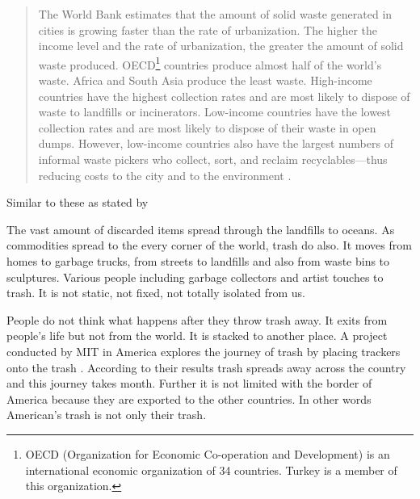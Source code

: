 %
\begin{quote}
The World Bank estimates that the amount of solid waste generated in cities is growing faster than the rate of urbanization. The higher the income level and the rate of urbanization, the greater the amount of solid waste produced. OECD\footnote{OECD (Organization for Economic Co-operation and Development) is an international economic organization of 34 countries. Turkey is a member of this organization.} countries produce almost half of the world’s waste. Africa and South Asia produce the least waste. High-income countries have the highest collection rates and are most likely to dispose of waste to landfills or incinerators. Low-income countries have the lowest collection rates and are most likely to dispose of their waste in open dumps. However, low-income countries also have the largest numbers of informal waste pickers who collect, sort, and reclaim recyclables---thus reducing costs to the city and to the environment \citep{fash2015trash}.
\end{quote}

Similar to these as stated by \cite{cerny1996recycled} 





%
%
The vast amount of discarded items spread through the landfills to oceans. As commodities spread to the every corner of the world, trash do also. It moves from homes to garbage trucks, from streets to landfills and also from waste bins to sculptures. Various people including garbage collectors and artist touches to trash. It is not static, not fixed, not totally isolated from us.


People do not think what happens after they throw trash away.  It exits from people's life but not from the world. It is stacked to another place. A project conducted by MIT in America explores the journey of trash by placing trackers onto the trash \citep{chen2009mit}. According to their results trash spreads away across the country and this journey takes month. Further it is not limited with the border of America because they are exported to the other countries. In other words American's trash is not only their trash. 


